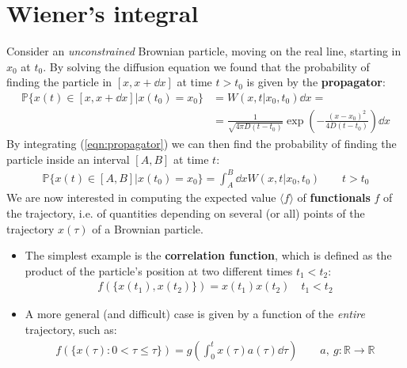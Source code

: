 \documentclass[../template.tex]{subfiles}
\begin{document}
\section{Wiener's integral}
Consider an \textit{unconstrained} Brownian particle, moving on the real line, starting in $x_0$ at $t_0$. By solving the diffusion equation we found that the probability of finding the particle in $[x,x+\dd{x}]$ at time $t > t_0$ is given by the \textbf{propagator}:
\begin{align} \nonumber
  \mathbb{P}\{x(t) \in [x,x+\dd{x}]|x(t_0) = x_0\} &=  W(x,t|x_0,t_0) \dd{x} = \\
  &= \frac{1}{\sqrt{4 \pi D (t-t_0) }} \exp\left(-\frac{(x-x_0)^2}{4 D (t-t_0)} \right) \dd{x} \label{eqn:propagator}
\end{align}  
By integrating (\ref{eqn:propagator}) we can then find the probability of finding the particle inside an interval $[A,B]$ at time $t$: 
\begin{align*}
    \mathbb{P}\{x(t) \in [A,B]|x(t_0) = x_0\} = \int_A^B \dd{x} W(x,t|x_0, t_0) \qquad t>t_0
\end{align*}
We are now interested in computing the expected value $\langle f \rangle$  of \textbf{functionals} $f$ of the trajectory, i.e. of quantities depending on several (or all) points of the trajectory $x(\tau)$ of a Brownian particle. 

\begin{itemize}
    \item The simplest example is the \textbf{correlation function}, which is defined as the product of the particle's position at two different times $t_1 < t_2$:
    \begin{align*}
        f(\{x(t_1), x(t_2)\}) = x(t_1) x(t_2) \quad t_1 < t_2
    \end{align*} 

    \item A more general (and difficult) case is given by a function of the \textit{entire} trajectory, such as:
    \begin{align*}
        f(\{x(\tau)\colon 0 < \tau \leq \tau\}) = g\left(\int_0^t x(\tau) a(\tau) \dd{\tau}\right)\qquad a,\>g\colon \mathbb{R} \to \mathbb{R}
    \end{align*}
\end{itemize}
\end{document}
